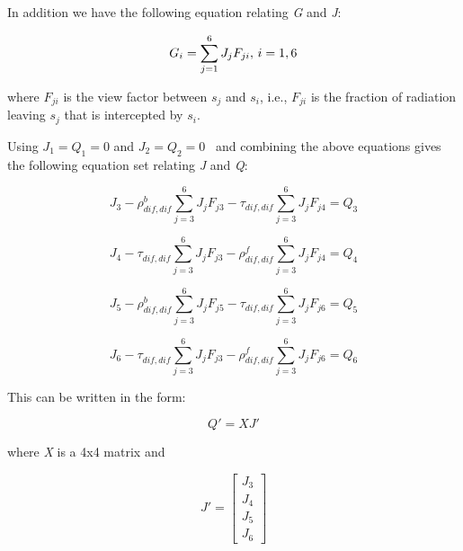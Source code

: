 In addition we have the following equation relating \emph{G} and \emph{J}:

\begin{equation}
{G_i} = \sum\limits_{j = 1}^6 {{J_j}{F_{ji}}{\rm{ ,    }}~i = 1,6}
\end{equation}

where \({F_{ji}}\) is the view factor between \({s_j}\) and \({s_i}\), i.e., \({F_{ji}}\) is the fraction of radiation leaving \({s_j}\) that is intercepted by \({s_i}\).

Using \({J_1} = {Q_1} = 0\) and \({J_2} = {Q_2} = 0\) ~and combining the above equations gives the following equation set relating \emph{J} and \emph{Q}:

\begin{equation}
{J_3} - \rho_{dif,dif}^b\sum\limits_{j = 3}^6 {{J_j}{F_{j3}} - {\tau_{dif,dif}}\sum\limits_{j = 3}^6 {{J_j}{F_{j4}} = {Q_3}} }
\end{equation}

\begin{equation}
{J_4} - \tau_{dif,dif}^{}\sum\limits_{j = 3}^6 {{J_j}{F_{j3}} - \rho_{dif,dif}^f\sum\limits_{j = 3}^6 {{J_j}{F_{j4}} = {Q_4}} }
\end{equation}

\begin{equation}
{J_5} - \rho_{dif,dif}^b\sum\limits_{j = 3}^6 {{J_j}{F_{j5}} - {\tau_{dif,dif}}\sum\limits_{j = 3}^6 {{J_j}{F_{j6}} = {Q_5}} }
\end{equation}

\begin{equation}
{J_6} - \tau_{dif,dif}^{}\sum\limits_{j = 3}^6 {{J_j}{F_{j3}} - \rho_{dif,dif}^f\sum\limits_{j = 3}^6 {{J_j}{F_{j6}} = {Q_6}} }
\end{equation}

This can be written in the form:

\begin{equation}
Q' = XJ'
\label{eq:QequalsXJprime}
\end{equation}

where \emph{X} is a 4x4 matrix and

\begin{equation}
J' = \left[ \begin{array}{c}
   J_3 \\
   J_4 \\
   J_5 \\
   J_6 \end{array} \right]
\end{equation}

